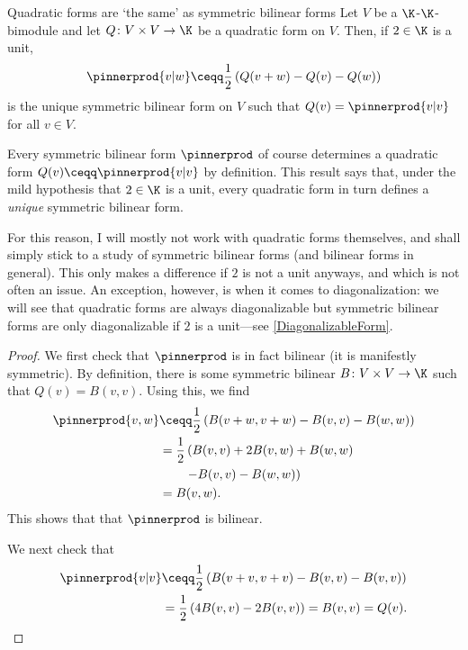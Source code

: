 \begin{thm}{Quadratic forms are `the same' as symmetric bilinear forms}{}
	Let $V$ be a $\K$-$\K$-bimodule and let $Q\colon V\times V\rightarrow \K$ be a quadratic form on $V$.  Then, if $2\in \K$ is a unit,
	\begin{equation}
		\pinnerprod{v|w}\ceqq \frac{1}{2}\left( Q(v+w)-Q(v)-Q(w)\right) 
	\end{equation}
	is the unique symmetric bilinear form on $V$ such that $Q(v)=\pinnerprod{v|v}$ for all $v\in V$.
	\begin{rmk}
		Every symmetric bilinear form $\pinnerprod$ of course determines a quadratic form $Q(v)\ceqq \pinnerprod{v|v}$ by definition.  This result says that, under the mild hypothesis that $2\in \K$ is a unit, every quadratic form in turn defines a \emph{unique} symmetric bilinear form.
	\end{rmk}
	\begin{rmk}
		For this reason, I will mostly not work with quadratic forms themselves, and shall simply stick to a study of symmetric bilinear forms (and bilinear forms in general).  This only makes a difference if $2$ is not a unit anyways, and which is not often an issue.  An exception, however, is when it comes to diagonalization:  we will see that quadratic forms are always diagonalizable but symmetric bilinear forms are only diagonalizable if $2$ is a unit---see \cref{DiagonalizableForm}.
	\end{rmk}
	\begin{proof}
		We first check that $\pinnerprod$ is in fact bilinear (it is manifestly symmetric).  By definition, there is some symmetric bilinear $B\colon V\times V\rightarrow \K$ such that $Q(v)=B(v,v)$.  Using this, we find
		\begin{equation}
			\begin{split}
				\pinnerprod{v,w} & \ceqq \frac{1}{2}\left( B(v+w,v+w)-B(v,v)-B(w,w)\right) \\
				& =\frac{1}{2}\left( B(v,v)+2B(v,w)+B(w,w)\right. \\ & \qquad \left. -B(v,v)-B(w,w)\right) \\
				& =B(v,w).
			\end{split} 
		\end{equation}
		This shows that that $\pinnerprod$ is bilinear.
		
		We next check that
		\begin{equation}
			\begin{split}
				\pinnerprod{v|v} & \ceqq \frac{1}{2}\left( B(v+v,v+v)-B(v,v)-B(v,v)\right) \\
				& =\frac{1}{2}\left( 4B(v,v)-2B(v,v)\right) =B(v,v)=Q(v).
			\end{split}
		\end{equation}
		

\end{proof}
\end{thm}
